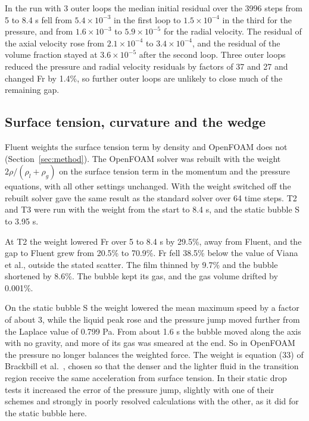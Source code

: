 \documentclass[11pt,a4paper]{article}
\begin{document}
In the run with 3 outer loops the median initial residual over the 3996 steps from 5 to 8.4 s fell from $5.4\times10^{-3}$ in the first loop to $1.5\times10^{-4}$ in the third for the pressure, and from $1.6\times10^{-3}$ to $5.9\times10^{-5}$ for the radial velocity. The residual of the axial velocity rose from $2.1\times10^{-4}$ to $3.4\times10^{-4}$, and the residual of the volume fraction stayed at $3.6\times10^{-5}$ after the second loop. Three outer loops reduced the pressure and radial velocity residuals by factors of 37 and 27 and changed Fr by 1.4\%, so further outer loops are unlikely to close much of the remaining gap.

\subsection{Surface tension, curvature and the wedge}

Fluent weights the surface tension term by density and OpenFOAM does not (Section~\ref{sec:method}). The OpenFOAM solver was rebuilt with the weight $2\rho/(\rho_l+\rho_g)$ on the surface tension term in the momentum and the pressure equations, with all other settings unchanged. With the weight switched off the rebuilt solver gave the same result as the standard solver over 64 time steps. T2 and T3 were run with the weight from the start to 8.4 s, and the static bubble S to 3.95 s.

At T2 the weight lowered Fr over 5 to 8.4 s by 29.5\%, away from Fluent, and the gap to Fluent grew from 20.5\% to 70.9\%. Fr fell 38.5\% below the value of Viana et al., outside the stated scatter. The film thinned by 9.7\% and the bubble shortened by 8.6\%. The bubble kept its gas, and the gas volume drifted by 0.001\%.

On the static bubble S the weight lowered the mean maximum speed by a factor of about 3, while the liquid peak rose and the pressure jump moved further from the Laplace value of 0.799 Pa. From about 1.6 s the bubble moved along the axis with no gravity, and more of its gas was smeared at the end. So in OpenFOAM the pressure no longer balances the weighted force. The weight is equation (33) of Brackbill et al.\ \cite{brackbill1992continuum}, chosen so that the denser and the lighter fluid in the transition region receive the same acceleration from surface tension. In their static drop tests it increased the error of the pressure jump, slightly with one of their schemes and strongly in poorly resolved calculations with the other, as it did for the static bubble here.
\end{document}
